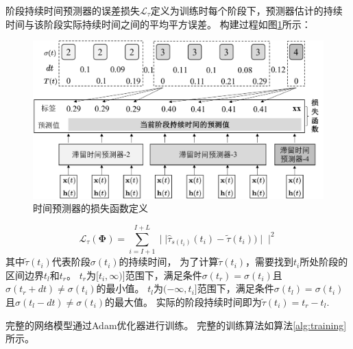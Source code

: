 阶段持续时间预测器的误差损失$\mathcal{L}_{\tau}$定义为训练时每个阶段下，预测器估计的持续时间与该阶段实际持续时间之间的平均平方误差。
构建过程如图\ref{fig:dt_label}所示：
\begin{figure}
    \centering
    \includegraphics[width=0.8\linewidth]{figures/chapter4/dt_label.pdf}
    \caption{时间预测器的损失函数定义}
    \label{fig:dt_label}
\end{figure}
\begin{equation}
    \mathcal{L_{\tau}}(\boldsymbol \Phi) =\sum_{i=I+1}^{I+L} \mid\mid\hat{\tau}_{s(t_i) }(t_i)-\tilde {\tau}(t_i))\mid\mid^2
\end{equation}
其中$\tilde {\tau}(t_i)$代表阶段$\sigma(t_i)$的持续时间，
为了计算$\tilde {\tau}(t_i)$，需要找到$t_i$所处阶段的区间边界$t_l$和$t_r$。
$t_r$为$[t_i, \infty)$]范围下，满足条件$\sigma(t_r)=\sigma(t_i)$且$\sigma(t_r+dt)\neq \sigma(t_i)$的最小值。
$t_l$为$(-\infty, t_i]$范围下，满足条件$\sigma(t_l)=\sigma(t_i)$且$\sigma(t_l-dt)\neq \sigma(t_i)$的最大值。
实际的阶段持续时间即为$\tilde {\tau}(t_i)=t_r-t_l$.


完整的网络模型通过Adam优化器进行训练。
完整的训练算法如算法\ref{alg:training}所示。

